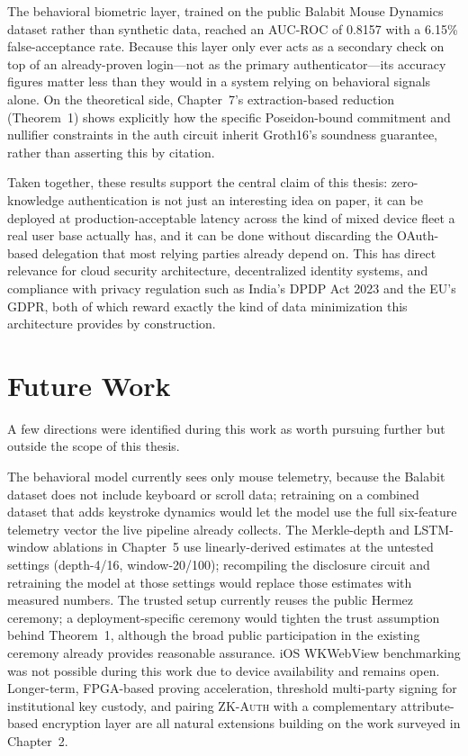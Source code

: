 \documentclass[12pt,a4paper,oneside]{report}
\begin{document}
The behavioral biometric layer, trained on the public Balabit Mouse
Dynamics dataset rather than synthetic data, reached an AUC-ROC of
0.8157 with a 6.15\% false-acceptance rate. Because this layer only ever
acts as a secondary check on top of an already-proven login---not as the
primary authenticator---its accuracy figures matter less than they would
in a system relying on behavioral signals alone. On the theoretical
side, Chapter~7's extraction-based reduction (Theorem~1) shows explicitly
how the specific Poseidon-bound commitment and nullifier constraints in
the auth circuit inherit Groth16's soundness guarantee, rather than
asserting this by citation.

Taken together, these results support the central claim of this thesis:
zero-knowledge authentication is not just an interesting idea on paper,
it can be deployed at production-acceptable latency across the kind of
mixed device fleet a real user base actually has, and it can be done
without discarding the OAuth-based delegation that most relying parties
already depend on. This has direct relevance for cloud security
architecture, decentralized identity systems, and compliance with privacy
regulation such as India's DPDP Act 2023 and the EU's GDPR, both of which
reward exactly the kind of data minimization this architecture provides
by construction.

\section{Future Work}

A few directions were identified during this work as worth pursuing
further but outside the scope of this thesis.

The behavioral model currently sees only mouse telemetry, because the
Balabit dataset does not include keyboard or scroll data; retraining on a
combined dataset that adds keystroke dynamics would let the model use
the full six-feature telemetry vector the live pipeline already
collects. The Merkle-depth and LSTM-window ablations in Chapter~5 use
linearly-derived estimates at the untested settings (depth-4/16,
window-20/100); recompiling the disclosure circuit and retraining the
model at those settings would replace those estimates with measured
numbers. The trusted setup currently reuses the public Hermez ceremony;
a deployment-specific ceremony would tighten the trust assumption
behind Theorem~1, although the broad public participation in the
existing ceremony already provides reasonable assurance. iOS WKWebView
benchmarking was not possible during this work due to device
availability and remains open. Longer-term, FPGA-based proving
acceleration, threshold multi-party signing for institutional key
custody, and pairing \textsc{ZK-Auth} with a complementary
attribute-based encryption layer are all natural extensions building on
the work surveyed in Chapter~2.
\end{document}
